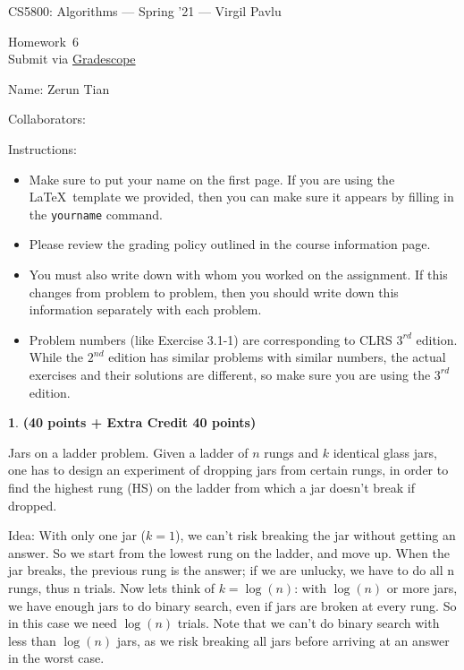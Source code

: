 \documentclass[11pt]{article}
\newcommand{\yourname}{Zerun Tian}
\newcommand{\yourcollaborators}{}
\theoremstyle{definition}
\newcommand{\instructor}{Virgil Pavlu}
\newcommand{\hwnum}{6}
\theoremstyle{theorem}
\newtheorem{prob}{}
\begin{document}
{\Large 
\begin{center}{CS5800: Algorithms} --- Spring '21 --- \instructor \end{center}}
{\large
\vspace{10pt}
\noindent Homework~\hwnum \vspace{2pt}\\
Submit via \href{https://www.gradescope.com/courses/232127}{Gradescope}}

\bigskip
{\large \noindent Name: \yourname }

{\large \noindent Collaborators: \yourcollaborators}

\vspace{15pt}

{\large \noindent Instructions:}

\begin{itemize}

\item Make sure to put your name on the first page.  If you are using the \LaTeX~template we provided, then you can make sure it appears by filling in the \texttt{yourname} command.

\item Please review the grading policy outlined in the course information page.

\item You must also write down with whom you worked on the assignment.  If this changes from problem to problem, then you should write down this information separately with each problem.

\item Problem numbers (like Exercise 3.1-1) are corresponding to CLRS $3^{rd}$ edition.  While the  $2^{nd}$ edition  has  similar  problems  with  similar  numbers,  the  actual  exercises  and their solutions are different, so make sure you are using the $3^{rd}$ edition.

\end{itemize}

\newpage
\begin{prob} \textbf{(40 points + Extra Credit 40 points)}
\end{prob}
Jars on a ladder problem.  Given a ladder of $n$ rungs and $k$ identical glass jars,  one has to design an experiment of dropping jars from certain rungs, in order to find the highest rung (HS) on the ladder from which a jar doesn’t break if dropped.

Idea: With only one jar ($k=1$), we can’t risk breaking the jar without getting an answer. So we start from the lowest rung on the ladder, and move up.  When the jar breaks, the previous rung is the answer; if we are unlucky, we have to do all n rungs, thus n trials. Now lets think of $k=\log(n)$:  with $\log(n)$ or more jars, we have enough jars to do binary search,  even  if  jars  are  broken  at  every  rung. So  in  this  case  we  need  $\log(n)$  trials. Note  that  we  can’t  do  binary  search  with  less  than  $\log(n)$  jars,  as  we  risk  breaking  all jars before arriving at an answer in the worst case.
\end{document}
